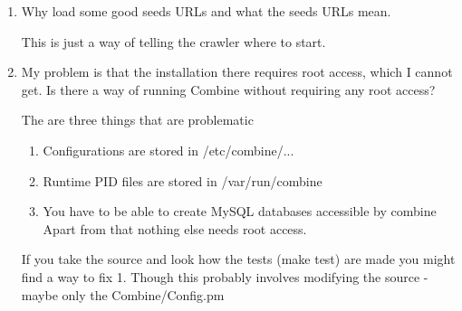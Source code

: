 \begin{enumerate}
\begin{enumerate}
\item Initialization\\
{\tt sudo combineINIT -jobname cptest -topic TopicYahooIce.txt}

\item Edit the configuration to only allow crawling of www.yahoo.com
Change the <allow> part in /etc/combine/focustest/combine.cfg from

\begin{verbatim}
#use either URL or HOST: (obs ':') to match regular expressions to either the
#full URL or the HOST part of a URL.
<allow>
#Allow crawl of URLs or hostnames that matches these regular expressions
HOST: .*$
</allow>
\end{verbatim}

to

\begin{verbatim}
#use either URL or HOST: (obs ':') to match regular expressions to either the
#full URL or the HOST part of a URL.
<allow>
#Allow crawl of URLs or hostnames that matches these regular expressions
HOST: www\.yahoo\.com$
</allow>
\end{verbatim}

\item Load some good seed URLs

\item Start 1 harvesting process
\end{enumerate}

\item
Why load some good seeds URLs and what the seeds URLs mean.

This is just a way of telling the crawler where to start.

\item
 My problem is that the
installation there requires root access, which I cannot get.
Is there a
way of running Combine without requiring any root access?

The are three things that are problematic
\begin{enumerate}
  \item Configurations are stored in /etc/combine/...
  \item Runtime PID files are stored in /var/run/combine
  \item You have to be able to create MySQL databases accessible by combine
Apart from that nothing else needs root access.
\end{enumerate}

If you take the source and look how the tests (make test) are made you might find a way to
fix 1. Though this probably involves modifying the source - maybe only the Combine/Config.pm


\end{enumerate}
